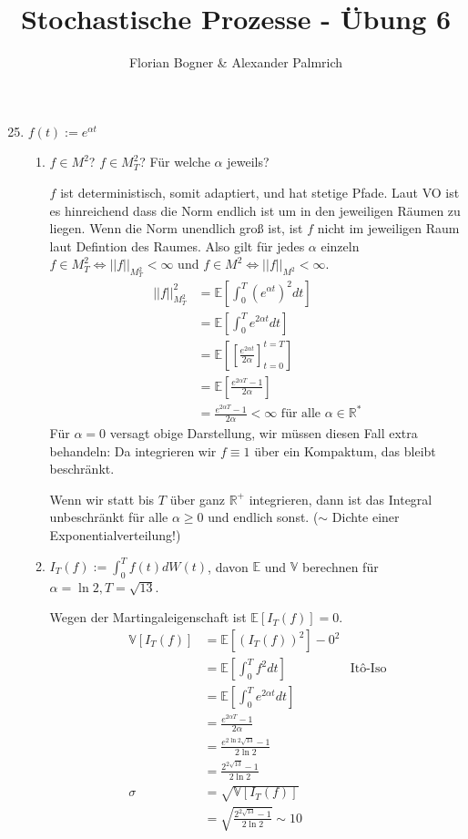 \documentclass[a4paper,11pt,notitlepage,fullpage]{article}
\newcommand{\E}{\mathbb E}
\newcommand{\Ee}[1]{\mathbb E\left[#1\right]}
\newcommand{\V}{\mathbb V}
\newcommand{\Vv}[1]{\mathbb V\left[#1\right]}
\newcommand{\norm}[2]{\left|\left|{#1}\right|\right|_{#2}}
\begin{document}
\author{Florian Bogner \& Alexander Palmrich}
\title{Stochastische Prozesse - Übung 6}
\maketitle

\begin{enumerate}
\setcounter{enumi}{24}


\item $f(t):=e^{\alpha t}$
\begin{enumerate}
\item $f\in M^2$? $f\in M^2_T$? Für welche $\alpha$ jeweils?

$f$ ist deterministisch, somit adaptiert, und hat stetige Pfade. Laut VO ist es hinreichend dass die Norm endlich ist um in den jeweiligen Räumen zu liegen. Wenn die Norm unendlich groß ist, ist $f$ nicht im jeweiligen Raum laut Defintion des Raumes. Also gilt für jedes $\alpha$ einzeln $f\in M^2_T \Leftrightarrow \norm{f}{M^2_T}<\infty$ und $f\in M^2 \Leftrightarrow \norm{f}{M^2}<\infty$.
\begin{align*}
\norm{f}{M^2_T}^2 &= \Ee{\int_0^T (e^{\alpha t})^2 dt}\\
&= \Ee{\int_0^T e^{2\alpha t} dt}\\
&= \Ee{\left[\frac{e^{2\alpha t}}{2\alpha}\right]_{t=0}^{t=T}}\\
&= \Ee{\frac{e^{2\alpha T}-1}{2\alpha}}\\
&= \frac{e^{2\alpha T}-1}{2\alpha} < \infty \text{ für alle } \alpha \in \mathbb{R}^*
\end{align*}
Für $\alpha=0$ versagt obige Darstellung, wir müssen diesen Fall extra behandeln: Da integrieren wir $f\equiv 1$ über ein Kompaktum, das bleibt beschränkt.

Wenn wir statt bis $T$ über ganz $\mathbb{R}^+$ integrieren, dann ist das Integral unbeschränkt für alle $\alpha\geq 0$ und endlich sonst. ($\sim$ Dichte einer Exponentialverteilung!)

\item $I_T(f):= \int_0^T f(t) dW(t)$, davon $\E$ und $\V$ berechnen für $\alpha=\ln 2, T=\sqrt{13}$.

Wegen der Martingaleigenschaft ist $\Ee{I_T(f)} = 0$.
\begin{align*}
\Vv{I_T(f)} &= \Ee{(I_T(f))^2} - 0^2\\
&=\Ee{\int_0^T f^2 dt} &\text{Itô-Iso}\\
&=\Ee{\int_0^T e^{2\alpha t} dt}\\
&= \frac{e^{2\alpha T}-1}{2\alpha}\\
&= \frac{e^{2\ln 2 \sqrt{13}}-1}{2\ln 2}\\
&= \frac{2^{2\sqrt{13}}-1}{2\ln 2} \\
\sigma &= \sqrt{\Vv{I_T(f)}} \\
&= \sqrt{\frac{2^{2\sqrt{13}}-1}{2\ln 2}} \sim 10
\end{align*}


\end{enumerate}
\end{enumerate}
\end{document}
